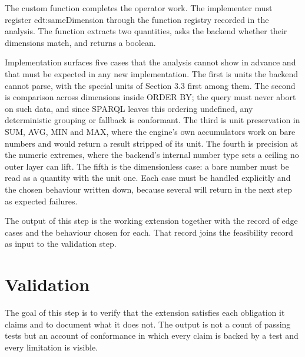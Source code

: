The custom function completes the operator work. The implementer must register cdt:sameDimension through the function registry recorded in the analysis. The function extracts two quantities, asks the backend whether their dimensions match, and returns a boolean.

Implementation surfaces five cases that the analysis cannot show in advance and that must be expected in any new implementation. The first is units the backend cannot parse, with the special units of Section 3.3 first among them. The second is comparison across dimensions inside ORDER BY; the query must never abort on such data, and since SPARQL leaves this ordering undefined, any deterministic grouping or fallback is conformant. The third is unit preservation in SUM, AVG, MIN and MAX, where the engine's own accumulators work on bare numbers and would return a result stripped of its unit. The fourth is precision at the numeric extremes, where the backend's internal number type sets a ceiling no outer layer can lift. The fifth is the dimensionless case: a bare number must be read as a quantity with the unit one. Each case must be handled explicitly and the chosen behaviour written down, because several will return in the next step as expected failures.

The output of this step is the working extension together with the record of edge cases and the behaviour chosen for each. That record joins the feasibility record as input to the validation step.

\section{Validation}

The goal of this step is to verify that the extension satisfies each obligation it claims and to document what it does not. The output is not a count of passing tests but an account of conformance in which every claim is backed by a test and every limitation is visible.

